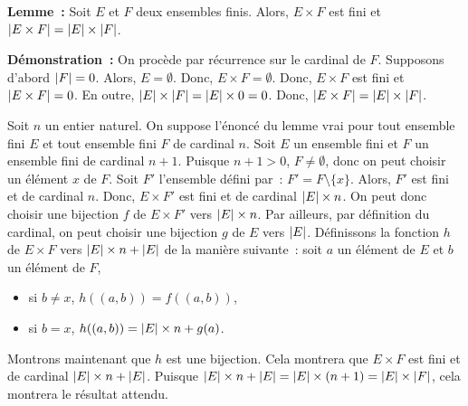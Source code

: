 \medskip

\noindent\textbf{Lemme :} Soit $E$ et $F$ deux ensembles finis.
    Alors, $E \times F$ est fini et $\left\lvert E \times F \right\rvert = \left\lvert E \right\rvert \times \left\lvert F \right\rvert$.

\medskip

\noindent\textbf{Démonstration :} 
On procède par récurrence sur le cardinal de $F$. 
Supposons d'abord $\left\lvert F \right\rvert = 0$.
Alors, $E = \emptyset$.
Donc, $E \times F = \emptyset$.
Donc, $E \times F$ est fini et $\left\lvert E \times F \right\rvert = 0$.
En outre, $\left\lvert E \right\rvert \times \left\lvert F \right\rvert = \left\lvert E \right\rvert \times 0 = 0$.
Donc, $\left\lvert E \times F \right\rvert = \left\lvert E \right\rvert \times \left\lvert F \right\rvert$.

Soit $n$ un entier naturel. 
On suppose l'énoncé du lemme vrai pour tout ensemble fini $E$ et tout ensemble fini $F$ de cardinal $n$.
Soit $E$ un ensemble fini et $F$ un ensemble fini de cardinal $n+1$.
Puisque $n+1 > 0$, $F \neq \emptyset$, donc on peut choisir un élément $x$ de $F$.
Soit $F'$ l'ensemble défini par : $F' = F \setminus \lbrace x \rbrace$. 
Alors, $F'$ est fini et de cardinal $n$. 
Donc, $E \times F'$ est fini et de cardinal $\left\lvert E \right\rvert \times n$.
On peut donc choisir une bijection $f$ de $E \times F'$ vers $\left\lvert E \right\rvert \times n$.
Par ailleurs, par définition du cardinal, on peut choisir une bijection $g$ de $E$ vers $\left\lvert E \right\rvert$. 
Définissons la fonction $h$ de $E \times F$ vers $\left\lvert E \right\rvert \times n + \left\lvert E \right\rvert$ de la manière suivante : soit $a$ un élément de $E$ et $b$ un élément de $F$,
\begin{itemize}[nosep]
    \item si $b \neq x$, $h((a,b)) = f((a,b))$,
    \item si $b = x$, $h((a,b)) = \left\lvert E \right\rvert \times n + g(a)$.
\end{itemize}
Montrons maintenant que $h$ est une bijection. 
Cela montrera que $E \times F$ est fini et de cardinal $\left\lvert E \right\rvert \times n + \left\lvert E \right\rvert$.
Puisque $\left\lvert E \right\rvert \times n + \left\lvert E \right\rvert = \left\lvert E \right\rvert \times (n+1) = \left\lvert E \right\rvert \times \left\lvert F \right\rvert$, cela montrera le résultat attendu.

